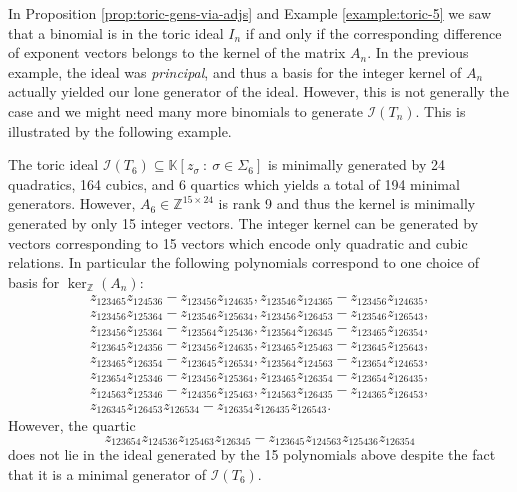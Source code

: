 \documentclass[12pt, reqno]{amsart}
\numberwithin{equation}{section}
\theoremstyle{plain}
\theoremstyle{definition}
\newenvironment{example}
  {\pushQED{\qed}\renewcommand{\qedsymbol}{$\triangle$}\examplex}
  {\popQED\endexamplex}
\newcommand{\zz}{\mathbb{Z}}
\newcommand{\kk}{\mathbb{K}}
\newcommand{\ci}{\mathcal{I}}
\begin{document}
In Proposition \ref{prop:toric-gens-via-adjs} and Example \ref{example:toric-5} we saw that a binomial is in the toric ideal $I_n$ if and only if the corresponding difference of exponent vectors belongs to the kernel of the matrix $A_n$. In the previous example, the ideal was \emph{principal}, and thus a basis for the integer kernel of $A_n$ actually yielded our lone generator of the ideal. However, this is not generally the case and we might need many more binomials to generate $\ci(T_n)$. This is illustrated by the following example. 

\begin{example}
\label{example:toric-6}
The toric ideal $\ci(T_6) \subseteq \kk[z_\sigma ~:~ \sigma \in \Sigma_6]$ is minimally generated by 24 quadratics, 164 cubics, and 6 quartics which yields a total of 194 minimal generators. However, $A_6 \in \zz^{15 \times 24}$ is rank 9 and thus the kernel is minimally generated by only 15 integer vectors. The integer kernel can be generated by vectors corresponding to 15 vectors which encode only quadratic and cubic relations. In particular the following polynomials correspond to one choice of basis for $\ker_\zz(A_n)$:
\begin{align*}
z_{123465}z_{124536}-z_{123456}z_{124635}, z_{123546}z_{124365}-z_{123456}z_{124635},\\
z_{123456}z_{125364}-z_{123546}z_{125634}, z_{123456}z_{126453}-z_{123546}z_{126543},\\ 
z_{123456}z_{125364}-z_{123564}z_{125436}, z_{123564}z_{126345}-z_{123465}z_{126354},\\
z_{123645}z_{124356}-z_{123456}z_{124635}, z_{123465}z_{125463}-z_{123645}z_{125643},\\
z_{123465}z_{126354}-z_{123645}z_{126534}, z_{123564}z_{124563}-z_{123654}z_{124653},\\
z_{123654}z_{125346}-z_{123456}z_{125364}, z_{123465}z_{126354}-z_{123654}z_{126435},\\
z_{124563}z_{125346}-z_{124356}z_{125463}, z_{124563}z_{126435}-z_{124365}z_{126453},\\
z_{126345}z_{126453}z_{126534}-z_{126354}z_{126435}z_{126543}.
\end{align*}
However, the quartic 
\[
z_{123654}z_{124536}z_{125463}z_{126345} - z_{123645}z_{124563}z_{125436}z_{126354}
\]
does not lie in the ideal generated by the 15 polynomials above despite the fact that it is a minimal generator of $\ci(T_6)$. 
\end{example}
\end{document}
